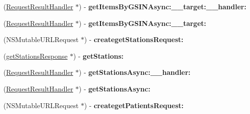 \begin{DoxyCompactItemize}
\item 
\hypertarget{interface_supply_chain_service_port_binding_a5dcaff5ba3ed10cecc9d3cc176bd2b05}{}(\hyperlink{interface_request_result_handler}{Request\+Result\+Handler} $\ast$) -\/ {\bfseries get\+Items\+By\+G\+S\+I\+N\+Async\+:\+\_\+\+\_\+target\+:\+\_\+\+\_\+handler\+:}\label{interface_supply_chain_service_port_binding_a5dcaff5ba3ed10cecc9d3cc176bd2b05}

\item 
\hypertarget{interface_supply_chain_service_port_binding_a5a8cf506ae314f7d659e4dab662b1949}{}(\hyperlink{interface_request_result_handler}{Request\+Result\+Handler} $\ast$) -\/ {\bfseries get\+Items\+By\+G\+S\+I\+N\+Async\+:\+\_\+\+\_\+target\+:}\label{interface_supply_chain_service_port_binding_a5a8cf506ae314f7d659e4dab662b1949}

\item 
\hypertarget{interface_supply_chain_service_port_binding_a2f93ed39f622586c65a9cb5e5aa89253}{}(N\+S\+Mutable\+U\+R\+L\+Request $\ast$) -\/ {\bfseries createget\+Stations\+Request\+:}\label{interface_supply_chain_service_port_binding_a2f93ed39f622586c65a9cb5e5aa89253}

\item 
\hypertarget{interface_supply_chain_service_port_binding_aa99a794a05b6a03ab2d3cdde116d08ac}{}(\hyperlink{interfaceget_stations_response}{get\+Stations\+Response} $\ast$) -\/ {\bfseries get\+Stations\+:}\label{interface_supply_chain_service_port_binding_aa99a794a05b6a03ab2d3cdde116d08ac}

\item 
\hypertarget{interface_supply_chain_service_port_binding_a160f99a73e6eb414341f2cabe5760df7}{}(\hyperlink{interface_request_result_handler}{Request\+Result\+Handler} $\ast$) -\/ {\bfseries get\+Stations\+Async\+:\+\_\+\+\_\+handler\+:}\label{interface_supply_chain_service_port_binding_a160f99a73e6eb414341f2cabe5760df7}

\item 
\hypertarget{interface_supply_chain_service_port_binding_a92e198596b274f560aeea379bf0f9140}{}(\hyperlink{interface_request_result_handler}{Request\+Result\+Handler} $\ast$) -\/ {\bfseries get\+Stations\+Async\+:}\label{interface_supply_chain_service_port_binding_a92e198596b274f560aeea379bf0f9140}

\item 
\hypertarget{interface_supply_chain_service_port_binding_ad4240fcb05c48b0072d5647eb37deeec}{}(N\+S\+Mutable\+U\+R\+L\+Request $\ast$) -\/ {\bfseries createget\+Patients\+Request\+:}\label{interface_supply_chain_service_port_binding_ad4240fcb05c48b0072d5647eb37deeec}


\end{DoxyCompactItemize}
